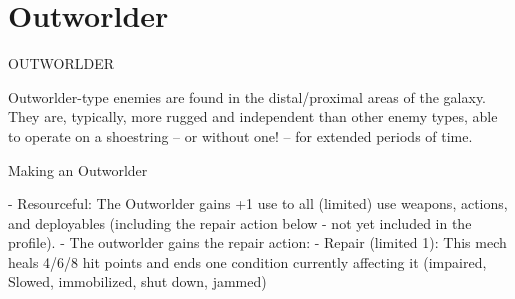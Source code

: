 \section{Outworlder}
                                            OUTWORLDER

Outworlder-type enemies are found in the distal/proximal areas of the galaxy. They are, typically,
more rugged and independent than other enemy types, able to operate on a shoestring -- or
without one! -- for extended periods of time.


Making an Outworlder


    -    Resourceful: The Outworlder gains +1 use to all (limited) use weapons, actions, and
        deployables (including the repair action below - not yet included in the profile).
    -   The outworlder gains the repair action:
             -   Repair (limited 1): This mech heals 4/6/8 hit points and ends one condition
                 currently affecting it (impaired, Slowed, immobilized, shut down, jammed)

